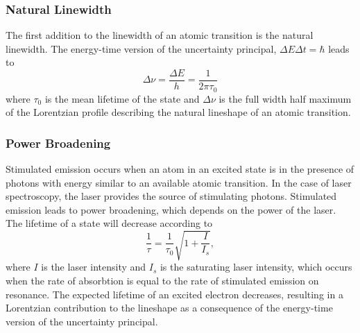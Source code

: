 \noindent \subsubsection{Natural Linewidth}
\noindent The first addition to the linewidth of an atomic transition is the natural linewidth. The energy-time version of the uncertainty principal, $\Delta E \Delta t= \hbar$ leads to 
\begin{equation}
\Delta \nu = \frac{\Delta E}{h}=\frac{1}{2 \pi \tau_0}
\end{equation}
where $\tau_0$ is the mean lifetime of the state and $\Delta \nu$ is the full width half maximum of the Lorentzian profile describing the natural lineshape of an atomic transition\cite{TomT}.

\noindent \subsubsection{Power Broadening}
Stimulated emission occurs when an atom in an excited state is in the presence of photons with energy similar to an available atomic transition. In the case of laser spectroscopy, the laser provides the source of stimulating photons. Stimulated emission leads to power broadening, which depends on the power of the laser. The lifetime of a state will decrease according to
\begin{equation}
\frac{1}{\tau}= \frac{1}{\tau_0}\sqrt{1+\frac{I}{I_s}},
\end{equation}
where $I$ is the laser intensity and $I_s$ is the saturating laser intensity, which occurs when the rate of absorbtion is equal to the rate of stimulated emission on resonance. The expected lifetime of an excited electron decreases, resulting in a Lorentzian contribution to the lineshape as a consequence of the energy-time version of the uncertainty principal\cite{TomT}.

